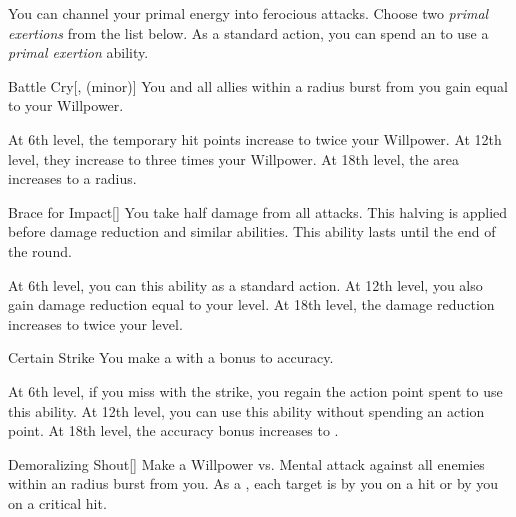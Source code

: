         You can channel your primal energy into ferocious attacks.
        Choose two \textit{primal exertions} from the list below.
        As a standard action, you can spend an  to use a \textit{primal exertion} ability.
        {
            \begin{ability}{Battle Cry}[,  (minor)]
                You and all allies within a \arealarge radius burst from you gain  equal to your Willpower.

                At 6th level, the temporary hit points increase to twice your Willpower.
                At 12th level, they increase to three times your Willpower.
                At 18th level, the area increases to a \areahuge radius.
            \end{ability}

            \begin{ability}{Brace for Impact}[]
                You take half damage from all attacks.
                This halving is applied before damage reduction and similar abilities.
                This ability lasts until the end of the round.

                At 6th level, you can  this ability as a standard action.
                At 12th level, you also gain damage reduction equal to your level.
                At 18th level, the damage reduction increases to twice your level.
            \end{ability}

            \begin{ability}{Certain Strike}
                You make a  with a  bonus to accuracy.

                At 6th level, if you miss with the strike, you regain the action point spent to use this ability.
                At 12th level, you can use this ability without spending an action point.
                At 18th level, the accuracy bonus increases to .
            \end{ability}

            \begin{ability}{Demoralizing Shout}[]
                Make a Willpower vs. Mental attack against all enemies within an \arealarge radius burst from you.
                As a , each target is \shaken by you on a hit or \frightened by you on a critical hit.


\end{ability}}
